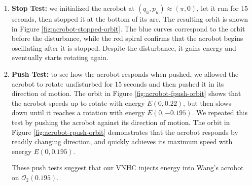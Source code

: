 \documentclass[journal,twoside,web]{ieeecolor}
\begin{document}
\begin{enumerate}
\item \textbf{Stop Test:}
    we initialized the acrobot at 
    \((q_u,p_u) \approx \left(\pi,0\right)\), let it run for 15
    seconds, then stopped it at the bottom of its arc.
    The resulting orbit is shown in Figure \ref{fig:acrobot-stopped-orbit}.
    The blue curves correspond to the orbit before the disturbance, while the red
    spiral confirms that the acrobot begins oscillating after it is stopped.
    Despite the disturbance, it gains energy and eventually starts rotating
    again.

\item \textbf{Push Test:}
    to see how the acrobot responds when pushed, we allowed
    the acrobot to rotate undisturbed for 15 seconds and then pushed it in its
    direction of motion.
    The orbit in Figure \ref{fig:acrobot-fpush-orbit} shows that the acrobot speeds
    up to rotate with energy \(E(0,0.22)\), but then slows down until it reaches a
    rotation with energy \(E(0,-0.195)\).
    We repeated this test by pushing the acrobot against its direction of motion.
    The orbit in Figure \ref{fig:acrobot-rpush-orbit} demonstrates that the acrobot
    responds by readily changing direction, and quickly achieves its maximum speed
    with energy \(E(0,0.195)\).

    These push tests suggest that our VNHC injects energy into Wang's acrobot on
    \(\mathcal{O}_2(0.195)\).
\end{enumerate}
\end{document}
